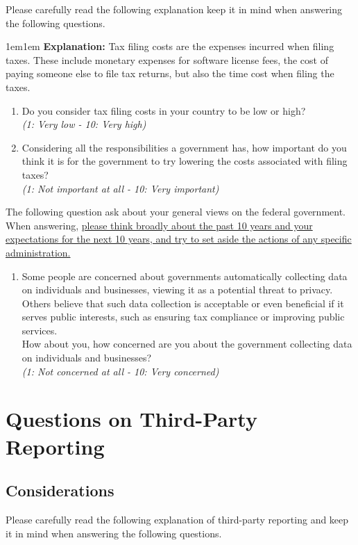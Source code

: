 \documentclass[11pt]{article}
\begin{document}
\noindent Please carefully read the following explanation keep it in mind when answering the following questions. \\
\begin{adjustwidth}{1em}{1em} \textbf{Explanation:} Tax filing costs are the expenses incurred when filing taxes. These include monetary expenses for software license fees, the cost of paying someone else to file tax returns, but also the time cost when filing the taxes. 
\end{adjustwidth}
\begin{enumerate}[resume]
    \item Do you consider tax filing costs in your country to be low or high?   \\ \textit{(1: Very low - 10: Very high)}
    \item Considering all the responsibilities a government has, how important do you think it is for the government to try lowering the costs associated with filing taxes? \\ \textit{(1: Not important at all - 10: Very important)}
\end{enumerate}
The following question ask about your general views on the federal government. When answering, \uline{please think broadly about the past 10 years and your expectations for the next 10 years, and try to set aside the actions of any specific administration.}

\begin{enumerate}[resume]
    \item Some people are concerned about governments automatically collecting data on individuals and businesses, viewing it as a potential threat to privacy. Others believe that such data collection is acceptable or even beneficial if it serves public interests, such as ensuring tax compliance or improving public services. \\ How about you, how concerned are you about the government collecting data on individuals and businesses?\\
    \textit{(1: Not concerned at all - 10: Very concerned)}
\end{enumerate}

\section*{Questions on Third-Party Reporting}
\subsection*{Considerations}
\noindent Please carefully read the following explanation of third-party reporting and keep it in mind when answering the following questions. \\
\end{document}
